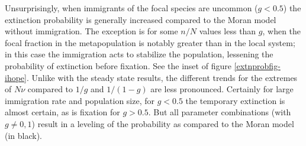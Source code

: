 Unsurprisingly, when immigrants of the focal species are uncommon ($g<0.5$) the extinction probability is generally increased compared to the Moran model without immigration. 
The exception is for some $n/N$ values less than $g$, when the focal fraction in the metapopulation is notably greater than in the local system; in this case the immigration acts to stabilize the population, lessening the probability of extinction before fixation. See the inset of figure \ref{extnprobfig-ihope}. 
Unlike with the steady state results, the different trends for the extremes of $N\nu$ compared to $1/g$ and $1/(1-g)$ are less pronounced. 
Certainly for large immigration rate and population size, for $g<0.5$ the temporary extinction is almost certain, as is fixation for $g>0.5$. 
But all parameter combinations (with $g\neq 0,1$) result in a leveling of the probability as compared to the Moran model (in black). %

